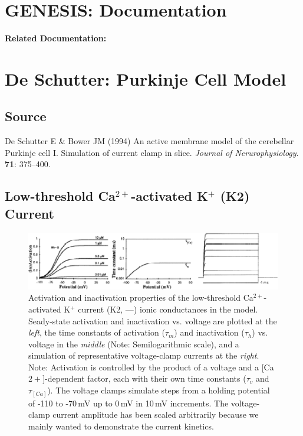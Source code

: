 \documentclass[12pt]{article}
\begin{document}
\section*{GENESIS: Documentation}

{\bf Related Documentation:}

\section*{De Schutter: Purkinje Cell Model}

\subsection*{Source}

De Schutter E \& Bower JM (1994) An active membrane model of the cerebellar Purkinje cell I. Simulation of current clamp in slice. {\it Journal of Nerurophysiology}. {\bf 71}: 375--400. \\

\subsection*{Low-threshold Ca$^{2+}$-activated K$^+$ (K2) Current}

\begin{figure}[h]
\centering
   \includegraphics[scale=0.75]{figures/DS1.2H.eps}
   \caption{Activation and inactivation properties of the low-threshold Ca$^{2+}$-activated K$^+$ current (K2, ---) ionic conductances in the model. Seady-state activation and inactivation vs. voltage are plotted at the {\em left}, the time constants of activation ($\tau_m$) and inactivation ($\tau_h$) vs. voltage in the {\em middle} (Note: Semilogarithmic scale), and a simulation of representative voltage-clamp currents at the {\em right}. Note: Activation is controlled by the product of a voltage and a [Ca${2+}$]-dependent factor, each with their own time constants ($\tau_v$ and $\tau_{[Ca]}$). The voltage clamps simulate steps from a holding potential of -110 to -70\,mV up to 0\,mV in 10\,mV increments. The voltage-clamp current amplitude has been scaled arbitrarily because we mainly wanted to demonstrate the current kinetics.}
   \label{fig:DS1.2H}
\end{figure}
\end{document}
